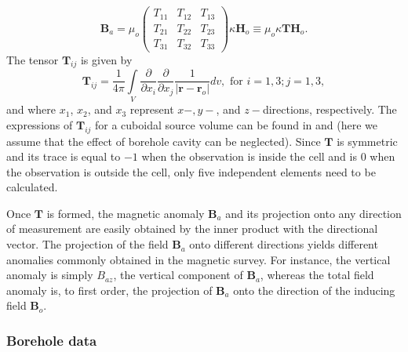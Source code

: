 \begin{equation}
\label{eq:bmatrix}
\mathbf{B}_a=\mu_o\left( \begin{array}{ccc}
T_{11} & T_{12} & T_{13} \\
T_{21} & T_{22} & T_{23}\\
T_{31} & T_{32} & T_{33}
\end{array} \right)\kappa\mathbf{H}_o\equiv \mu_o\kappa\mathbf{T}\mathbf{H}_o.
\end{equation}
%
The tensor $\mathbf{T}_{ij}$ is given by
%
\begin{equation}
\label{eq:tij}
\mathbf{T}_{ij}=\frac{1}{4\pi}\int\limits_V\frac{\partial}{\partial x_i}\frac{\partial}{\partial x_j}\frac{1}{\left |\mathbf{r}-\mathbf{r}_o\right |}dv, \mbox{  for }i=1,3 ; j=1,3,
\end{equation}
%
and where $x_1$, $x_2$, and $x_3$ represent $x-, y-$, and $z-$directions, respectively. The expressions of $\mathbf{T}_{ij}$  for a cuboidal source volume can be found in \cite{Bhattacharyya64} and \cite{Sharma66} (here we assume that the effect of borehole cavity can be neglected). Since $\mathbf{T}$ is symmetric and its trace is equal to $-1$ when the observation is inside the cell and is $0$ when the observation is outside the cell, only five independent elements need to be calculated.

Once $\mathbf{T}$ is formed, the magnetic anomaly $\mathbf{B}_a$ and its projection onto any direction of measurement are easily obtained by the inner product with the directional vector. The projection of the field $\mathbf{B}_a$ onto different directions yields different anomalies commonly obtained in the magnetic survey. For instance, the vertical anomaly is simply $B_{az}$, the vertical component of $\mathbf{B}_a$, whereas the total field anomaly is, to first order, the projection of $\mathbf{B}_a$ onto the direction of the inducing field $\mathbf{B}_o$.

\subsubsection{Borehole data}

